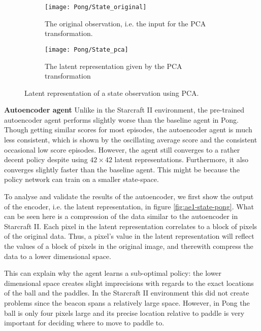 \begin{figure}[h!]
	\centering
	\begin{subfigure}[b]{0.75\textwidth}
		\texttt{[image: Pong/State\_original]}
		\caption{The original observation, i.e. the input for the PCA transformation.}
		\label{fig:pca-original-pong} 
	\end{subfigure}
	\begin{subfigure}[b]{0.75\textwidth}
		\texttt{[image: Pong/State\_pca]}
		\caption{The latent representation given by the PCA transformation}
		\label{fig:pca-latent-pong}
	\end{subfigure}
	\caption{Latent representation of a state observation using PCA.}
	\label{fig:pca-state-pong}
\end{figure}

\textbf{Autoencoder agent}\newline
\noindent
Unlike in the Starcraft II environment, the pre-trained autoencoder agent performs slightly worse than the baseline agent in Pong. Though getting similar scores for most episodes, the autoencoder agent is much less consistent, which is shown by the oscillating average score and the consistent occasional low score episodes. However, the agent still converges to a rather decent policy despite using $42 \times 42$ latent representations. Furthermore, it also converges slightly faster than the baseline agent. This might be because the policy network can train on a smaller state-space.

To analyse and validate the results of the autoencoder, we first show the output of the encoder, i.e. the latent representation, in figure \ref{fig:ae1-state-pong}. What can be seen here is a compression of the data similar to the autoencoder in Starcraft II. Each pixel in the latent representation correlates to a block of pixels of the original data. Thus, a pixel's value in the latent representation will reflect the values of a block of pixels in the original image, and therewith compress the data to a lower dimensional space. 

This can explain why the agent learns a sub-optimal policy: the lower dimensional space creates slight imprecisions with regards to the exact locations of the ball and the paddles. In the Starcraft II environment this did not create problems since the beacon spans a relatively large space. However, in Pong the ball is only four pixels large and its precise location relative to paddle is very important for deciding where to move to paddle to.

